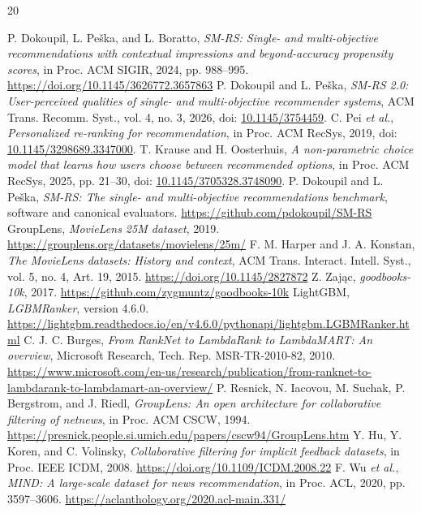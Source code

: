 \documentclass[11pt,onecolumn,conference,letterpaper]{IEEEtran}
\begin{document}
\clearpage
\begin{thebibliography}{20}
\raggedright
{} P. Dokoupil, L. Pe\v{s}ka, and L. Boratto, \emph{SM-RS: Single- and multi-objective recommendations with contextual impressions and beyond-accuracy propensity scores}, in Proc. ACM SIGIR, 2024, pp. 988--995. \url{https://doi.org/10.1145/3626772.3657863}
 P. Dokoupil and L. Pe\v{s}ka, \emph{SM-RS 2.0: User-perceived qualities of single- and multi-objective recommender systems}, ACM Trans. Recomm. Syst., vol. 4, no. 3, 2026, doi: \href{https://doi.org/10.1145/3754459}{10.1145/3754459}.
 C. Pei \emph{et al.}, \emph{Personalized re-ranking for recommendation}, in Proc. ACM RecSys, 2019, doi: \href{https://doi.org/10.1145/3298689.3347000}{10.1145/3298689.3347000}.
 T. Krause and H. Oosterhuis, \emph{A non-parametric choice model that learns how users choose between recommended options}, in Proc. ACM RecSys, 2025, pp. 21--30, doi: \href{https://doi.org/10.1145/3705328.3748090}{10.1145/3705328.3748090}.
 P. Dokoupil and L. Pe\v{s}ka, \emph{SM-RS: The single- and multi-objective recommendations benchmark}, software and canonical evaluators. \url{https://github.com/pdokoupil/SM-RS}
 GroupLens, \emph{MovieLens 25M dataset}, 2019. \url{https://grouplens.org/datasets/movielens/25m/}
 F. M. Harper and J. A. Konstan, \emph{The MovieLens datasets: History and context}, ACM Trans. Interact. Intell. Syst., vol. 5, no. 4, Art. 19, 2015. \url{https://doi.org/10.1145/2827872}
 Z. Zaj\k{a}c, \emph{goodbooks-10k}, 2017. \url{https://github.com/zygmuntz/goodbooks-10k}
 LightGBM, \emph{LGBMRanker}, version 4.6.0. \url{https://lightgbm.readthedocs.io/en/v4.6.0/pythonapi/lightgbm.LGBMRanker.html}
 C. J. C. Burges, \emph{From RankNet to LambdaRank to LambdaMART: An overview}, Microsoft Research, Tech. Rep. MSR-TR-2010-82, 2010. \url{https://www.microsoft.com/en-us/research/publication/from-ranknet-to-lambdarank-to-lambdamart-an-overview/}
 P. Resnick, N. Iacovou, M. Suchak, P. Bergstrom, and J. Riedl, \emph{GroupLens: An open architecture for collaborative filtering of netnews}, in Proc. ACM CSCW, 1994. \url{https://presnick.people.si.umich.edu/papers/cscw94/GroupLens.htm}
 Y. Hu, Y. Koren, and C. Volinsky, \emph{Collaborative filtering for implicit feedback datasets}, in Proc. IEEE ICDM, 2008. \url{https://doi.org/10.1109/ICDM.2008.22}
 F. Wu \emph{et al.}, \emph{MIND: A large-scale dataset for news recommendation}, in Proc. ACL, 2020, pp. 3597--3606. \url{https://aclanthology.org/2020.acl-main.331/}

\end{thebibliography}
\end{document}
